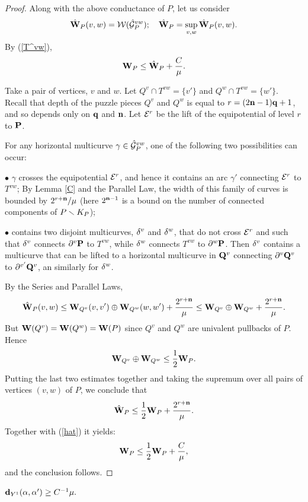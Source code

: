 \begin{proof}
    Along with the above conductance of $P$, let us consider
$$
    \hat{{\mathbf{W}}}_P(v,w) ={\mathcal W}(\hat{{\mathcal G}}_P^{vw});\quad \hat{{\mathbf{W}}}_P =\sup_{v,w} \hat{{\mathbf{W}}}_P(v,w).
 $$
By (\ref{T^vw}),
\begin{equation}\label{hat}
    {\mathbf{W}}_P \leq \hat{{\mathbf{W}}}_P + \frac{C}{\mu}.
\end{equation}

Take a pair of vertices, $v$ and $w$.
Let $Q^v\cap T^{vw}=\{v'\}$ and  $Q^w\cap T^{vw}= \{w'\}$.
Recall that depth of the puzzle pieces $Q^v$ and $Q^w$ is equal to $r=(2{\mathbf{n}}-1){\mathbf{q}}+1$,
and so depends only on ${\mathbf{q}}$ and ${\mathbf{n}}$. Let ${\mathcal E}^r$ be the lift of the equipotential of level $r$
to ${\mathbf{P}}$.

For any horizontal multicurve $\gamma\in \hat{{\mathcal G}}_P^{vw}$,
one of the following two  possibilities can occur:

\ssk\nin $\bullet$
  $\gamma$ crosses the equipotential ${\mathcal E}^r$, and hence it contains an arc $\gamma'$ connecting ${\mathcal E}^r$
to $T^{vw}$; By Lemma \ref{C} and the Parallel Law,
the width of this family of curves is bounded by $2^{r+{\mathbf{n}}} / \mu$ (here $2^{{\mathbf{n}}-1}$
is a bound on the number of connected components of $P\smallsetminus K_P$);

\ssk\nin $\bullet$
 contains two disjoint multicurves,
${\delta}^v$ and ${\delta}^w$, that do not cross ${\mathcal E}^r$ and such that ${\delta}^v$ connects $\partial^v{\mathbf{P}}$ to $T^{vw}$,
while ${\delta}^w$ connects $T^{vw}$ to $\partial^w{\mathbf{P}}$. Then ${\delta}^v$ contains a multicurve that can
be lifted to a horizontal multicurve in ${\mathbf{Q}}^v$ connecting $\partial^v{\mathbf{Q}}^v$ to $\partial^{v'}{\mathbf{Q}}^v$,
 an similarly for  ${\delta}^w$.

\ssk
By the Series and Parallel Laws,
$$
     \hat{{\mathbf{W}}}_P(v,w) \leq {\mathbf{W}}_{Q^v}(v, v') \oplus {\mathbf{W}}_{Q^w}(w,w')+ \frac{2^{r+{\mathbf{n}}}}{\mu}
           \leq {\mathbf{W}}_{Q^v} \oplus {\mathbf{W}}_{Q^w}+\frac{2^{r+{\mathbf{n}}}}{\mu}.
$$
But ${\mathbf{W}}(Q^v)={\mathbf{W}}(Q^w)= {\mathbf{W}}(P)$  since $Q^v$ and $Q^w$ are univalent pullbacks of $P$.
Hence
$$
   {\mathbf{W}}_{Q^v}\oplus {\mathbf{W}}_{Q^w}  \leq \frac{1}{2} {\mathbf{W}}_P.
$$
Putting the last two estimates together and taking the supremum over all pairs of vertices $(v,w)$ of $P$,
we conclude that
$$
   \hat{{\mathbf{W}}}_P\leq \frac{1}{2}{\mathbf{W}}_P + \frac{2^{r+{\mathbf{n}}}}{\mu}.
$$
 Together with  (\ref{hat}) it yields:
$$
   {\mathbf{W}}_P\leq \frac{1}{2} {\mathbf{W}}_P + \frac{C}{\mu},
$$
and the conclusion follows.
\end{proof}

\begin{prop}\label{separation prop}
  ${\mathbf{d}}_{Y^1}(\alpha, \alpha') \geq C^{-1}\mu. $
\end{prop}

